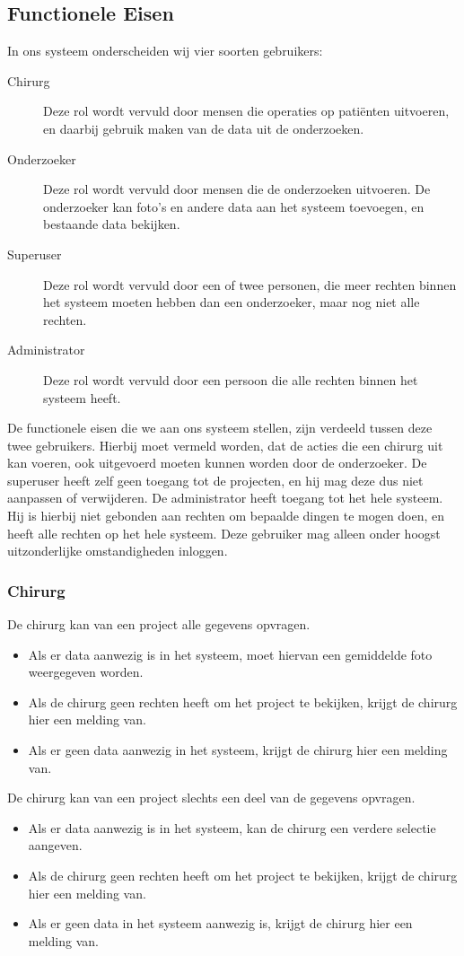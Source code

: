\subsection{Functionele Eisen}
\label{functionele_eisen}
In ons systeem onderscheiden wij vier soorten gebruikers:
\begin{description}
	\item[Chirurg] Deze rol wordt vervuld door mensen die operaties op pati\"enten uitvoeren, en daarbij gebruik maken van de data uit de onderzoeken.
	\item[Onderzoeker] Deze rol wordt vervuld door mensen die de onderzoeken uitvoeren. De onderzoeker kan foto's en andere data aan het systeem toevoegen, en bestaande data bekijken.	
	\item[Superuser] Deze rol wordt vervuld door een of twee personen, die meer rechten binnen het systeem moeten hebben dan een onderzoeker, maar nog niet alle rechten.
	\item[Administrator] Deze rol wordt vervuld door een persoon die alle rechten binnen het systeem heeft.
\end{description}
De functionele eisen die we aan ons systeem stellen, zijn verdeeld tussen deze twee gebruikers. Hierbij moet vermeld worden, dat de acties die een chirurg uit kan voeren, ook uitgevoerd moeten kunnen worden door de onderzoeker.
De superuser heeft zelf geen toegang tot de projecten, en hij mag deze dus niet aanpassen of verwijderen.
De administrator heeft toegang tot het hele systeem. 
Hij is hierbij niet gebonden aan rechten om bepaalde dingen te mogen doen, en heeft alle rechten op het hele systeem. 
Deze gebruiker mag alleen onder hoogst uitzonderlijke omstandigheden inloggen.
\subsubsection{Chirurg}

De chirurg kan van een project alle gegevens opvragen.
\begin{itemize}
	\item Als er data aanwezig is in het systeem, moet hiervan een gemiddelde foto weergegeven worden. 
	\item Als de chirurg geen rechten heeft om het project te bekijken, krijgt de chirurg hier een melding van.
	\item Als er geen data aanwezig in het systeem, krijgt de chirurg hier een melding van. 
\end{itemize}

De chirurg kan van een project slechts een deel van de gegevens opvragen.
\begin{itemize}
	\item Als er data aanwezig is in het systeem, kan de chirurg een verdere selectie aangeven.
	\item Als de chirurg geen rechten heeft om het project te bekijken, krijgt de chirurg hier een melding van.
	\item Als er geen data in het systeem aanwezig is, krijgt de chirurg hier een melding van.
\end{itemize}

